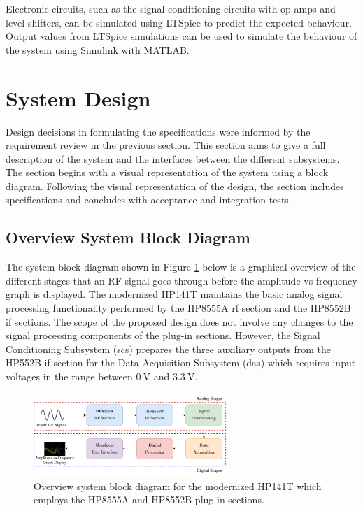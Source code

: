\documentclass[class=report,11pt,crop=false]{standalone}
\begin{document}
	Electronic circuits, such as the signal conditioning circuits with op-amps and level-shifters, can be simulated using LTSpice to predict the expected behaviour. Output values from LTSpice simulations can be used to simulate the behaviour of the system using Simulink with MATLAB.
	\clearpage		
	\section{System Design}
	
	Design decisions in formulating the specifications were informed by the requirement review in the previous section. This section aims to give a full description of the system and the interfaces between the different subsystems. The section begins with a visual representation of the system using a block diagram. Following the visual representation of the design, the section includes specifications and concludes with acceptance and integration tests. 
	
	\subsection{Overview System Block Diagram}
	
	The system block diagram shown in Figure \ref{fig:overall-system-block-diagram} below is a graphical overview of the different stages that an RF signal goes through before the amplitude vs frequency graph is displayed. The modernized HP141T maintains the basic analog signal processing functionality performed by the HP8555A \acrshort{rf} section and the HP8552B \acrshort{if} sections. The scope of the proposed design does not involve any changes to the signal processing components of the plug-in sections. However, the Signal Conditioning Subsystem (\acrshort{scs}) prepares the three auxiliary outputs from the HP552B \acrshort{if} section for the Data Acquisition Subsystem (\acrshort{das}) which requires input voltages in the range between $\SI{0}{\volt}$ and $\SI{3.3}{\volt}$. 	
	
	\begin{figure}
	 	\centering
	 	\includegraphics[width=0.65\textwidth]{Figures/Methodology/overall-system-diagram}
	 	\caption{Overview system block diagram for the modernized HP141T which employs the HP8555A and HP8552B plug-in sections.}
	 	\label{fig:overall-system-block-diagram}
	 \end{figure}
 
\end{document}
